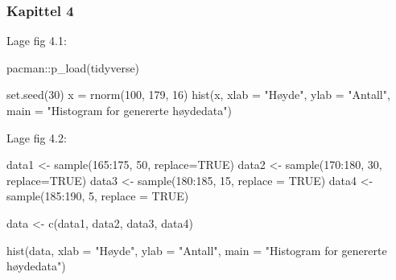 \documentclass[
]{book}
\newenvironment{Shaded}{\begin{snugshade}}{\end{snugshade}}
\newcommand{\AttributeTok}[1]{\textcolor[rgb]{0.77,0.63,0.00}{#1}}
\newcommand{\ConstantTok}[1]{\textcolor[rgb]{0.00,0.00,0.00}{#1}}
\newcommand{\DecValTok}[1]{\textcolor[rgb]{0.00,0.00,0.81}{#1}}
\newcommand{\FunctionTok}[1]{\textcolor[rgb]{0.00,0.00,0.00}{#1}}
\newcommand{\NormalTok}[1]{#1}
\newcommand{\OtherTok}[1]{\textcolor[rgb]{0.56,0.35,0.01}{#1}}
\newcommand{\SpecialCharTok}[1]{\textcolor[rgb]{0.00,0.00,0.00}{#1}}
\newcommand{\StringTok}[1]{\textcolor[rgb]{0.31,0.60,0.02}{#1}}
\begin{document}
\hypertarget{kapittel-4}{%
\subsubsection*{Kapittel 4}\label{kapittel-4}}

Lage fig 4.1:

\begin{Shaded}
\begin{Highlighting}[]
\NormalTok{pacman}\SpecialCharTok{::}\FunctionTok{p\_load}\NormalTok{(tidyverse)}

\FunctionTok{set.seed}\NormalTok{(}\DecValTok{30}\NormalTok{)}
\NormalTok{x }\OtherTok{=} \FunctionTok{rnorm}\NormalTok{(}\DecValTok{100}\NormalTok{, }\DecValTok{179}\NormalTok{, }\DecValTok{16}\NormalTok{)}
\FunctionTok{hist}\NormalTok{(x, }\AttributeTok{xlab =} \StringTok{"Høyde"}\NormalTok{, }\AttributeTok{ylab =} \StringTok{"Antall"}\NormalTok{, }\AttributeTok{main =} \StringTok{"Histogram for genererte høydedata"}\NormalTok{)}
\end{Highlighting}
\end{Shaded}

Lage fig 4.2:

\begin{Shaded}
\begin{Highlighting}[]
\NormalTok{data1 }\OtherTok{\textless{}{-}} \FunctionTok{sample}\NormalTok{(}\DecValTok{165}\SpecialCharTok{:}\DecValTok{175}\NormalTok{, }\DecValTok{50}\NormalTok{, }\AttributeTok{replace=}\ConstantTok{TRUE}\NormalTok{)}
\NormalTok{data2 }\OtherTok{\textless{}{-}} \FunctionTok{sample}\NormalTok{(}\DecValTok{170}\SpecialCharTok{:}\DecValTok{180}\NormalTok{, }\DecValTok{30}\NormalTok{, }\AttributeTok{replace=}\ConstantTok{TRUE}\NormalTok{)}
\NormalTok{data3 }\OtherTok{\textless{}{-}} \FunctionTok{sample}\NormalTok{(}\DecValTok{180}\SpecialCharTok{:}\DecValTok{185}\NormalTok{, }\DecValTok{15}\NormalTok{, }\AttributeTok{replace =} \ConstantTok{TRUE}\NormalTok{)}
\NormalTok{data4 }\OtherTok{\textless{}{-}} \FunctionTok{sample}\NormalTok{(}\DecValTok{185}\SpecialCharTok{:}\DecValTok{190}\NormalTok{, }\DecValTok{5}\NormalTok{, }\AttributeTok{replace =} \ConstantTok{TRUE}\NormalTok{)}

\NormalTok{data }\OtherTok{\textless{}{-}} \FunctionTok{c}\NormalTok{(data1, data2, data3, data4)}

\FunctionTok{hist}\NormalTok{(data, }\AttributeTok{xlab =} \StringTok{"Høyde"}\NormalTok{, }\AttributeTok{ylab =} \StringTok{"Antall"}\NormalTok{, }\AttributeTok{main =} \StringTok{"Histogram for genererte høydedata"}\NormalTok{)}
\end{Highlighting}
\end{Shaded}
\end{document}
